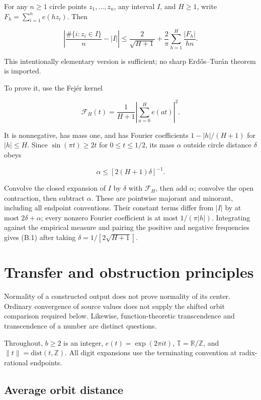 \documentclass[11pt,a4paper]{article}
\begin{document}
For any \(n\ge1\) circle points \(z_1,\ldots,z_n\), any interval \(I\),
and \(H\ge1\), write \(F_h=\sum_{i=1}^n e(hz_i)\). Then

\[
\left|\frac{\#\lbrace i:z_i\in I\rbrace }n-|I|\right|
 \le\frac2{\sqrt{H+1}}+\frac2\pi\sum_{h=1}^H\frac{|F_h|}{hn}.
\tag{B.1}
\]

This intentionally elementary version is sufficient; no sharp
Erdős--Turán theorem is imported.

To prove it, use the Fejér kernel

\[
\mathcal F_H(t)=\frac1{H+1}\left|\sum_{a=0}^He(at)\right|^2.
\]

It is nonnegative, has mass one, and has Fourier coefficients
\(1-|h|/(H+1)\) for \(|h|\le H\). Since \(\sin(\pi t)\ge2t\) for
\(0\le t\le1/2\), its mass \(\alpha\) outside circle distance \(\delta\)
obeys

\[
\alpha\le[2(H+1)\delta]^{-1}.
\]

Convolve the closed expansion of \(I\) by \(\delta\) with
\(\mathcal F_H\), then add \(\alpha\); convolve the open contraction,
then subtract \(\alpha\). These are pointwise majorant and minorant,
including all endpoint conventions. Their constant terms differ from
\(|I|\) by at most \(2\delta+\alpha\); every nonzero Fourier coefficient
is at most \(1/(\pi|h|)\). Integrating against the empirical measure and
pairing the positive and negative frequencies gives (B.1) after taking
\(\delta=1/[2\sqrt{H+1}]\).

\section{Transfer and obstruction
principles}\label{transfer-and-obstruction-principles}

Normality of a constructed output does not prove normality of its
center. Ordinary convergence of source values does not supply the
shifted orbit comparison required below. Likewise, function-theoretic
transcendence and transcendence of a number are distinct questions.

Throughout, \(b\ge2\) is an integer, \(e(t)=\exp(2\pi i t)\),
\(\mathbb T=\mathbb R/\mathbb Z\), and
\(\lVert t\rVert =\mathrm{dist}(t,\mathbb Z)\). All digit expansions use
the terminating convention at radix-rational endpoints.

\subsection{Average orbit distance}\label{average-orbit-distance}
\end{document}
